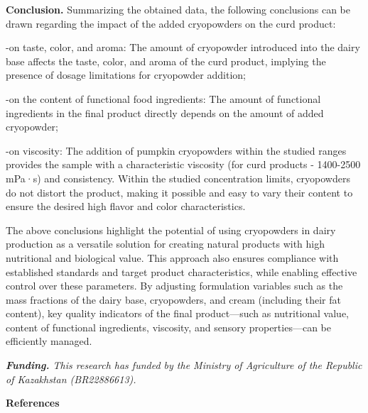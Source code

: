 \begin{multicols}{2}
{\bfseries Conclusion.} Summarizing the obtained data, the following
conclusions can be drawn regarding the impact of the added cryopowders
on the curd product:

-on taste, color, and aroma: The amount of cryopowder introduced into
the dairy base affects the taste, color, and aroma of the curd product,
implying the presence of dosage limitations for cryopowder addition;

-on the content of functional food ingredients: The amount of functional
ingredients in the final product directly depends on the amount of added
cryopowder;

-on viscosity: The addition of pumpkin cryopowders within the studied
ranges provides the sample with a characteristic viscosity (for curd
products - 1400-2500 mPa·s) and consistency. Within the studied
concentration limits, cryopowders do not distort the product, making it
possible and easy to vary their content to ensure the desired high
flavor and color characteristics.

The above conclusions highlight the potential of using cryopowders in
dairy production as a versatile solution for creating natural products
with high nutritional and biological value. This approach also ensures
compliance with established standards and target product
characteristics, while enabling effective control over these parameters.
By adjusting formulation variables such as the mass fractions of the
dairy base, cryopowders, and cream (including their fat content), key
quality indicators of the final product---such as nutritional value,
content of functional ingredients, viscosity, and sensory
properties---can be efficiently managed.

\emph{{\bfseries Funding.} This research has funded by the Ministry of
Agriculture of the Republic of Kazakhstan (BR22886613).}
\end{multicols}

\begin{center}
{\bfseries References}
\end{center}


